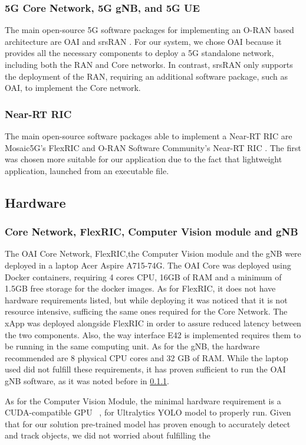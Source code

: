 \subsubsection{5G Core Network, 5G gNB, and 5G UE}
The main open-source 5G software packages for implementing an O-RAN based architecture are OAI \cite[]{} and srsRAN \cite[]{}. For our system, we chose OAI because it provides all the necessary components to deploy a 5G standalone network, including both the RAN and Core networks. In contrast, srsRAN only supports the deployment of the RAN, requiring an additional software package, such as OAI, to implement the Core network.

\subsubsection{Near-RT RIC}
The main open-source software packages able to implement a Near-RT RIC are Mosaic5G’s FlexRIC \cite[]{} and  O-RAN Software Community’s Near-RT RIC \cite[]{}.
The first was chosen more suitable for our application due to the fact that lightweight application, launched from an executable file.

\subsection{Hardware}
\subsubsection{Core Network, FlexRIC, Computer Vision module and gNB}
The OAI Core Network, FlexRIC,the Computer Vision module and the gNB were deployed in a laptop Acer Aspire A715-74G\@.
The OAI Core was deployed using Docker containers, requiring 4 cores CPU, 16GB of RAM and a minimum of 1.5GB free storage for the docker images.
As for FlexRIC, it does not have hardware requirements listed, but while deploying it was noticed that it is not resource intensive, sufficing the same ones required for the Core Network.
The xApp was deployed alongside FlexRIC in order to assure reduced latency between the two components.
Also,  the way interface E42 is implemented requires them to be running in the same computing unit.
As for the gNB, the hardware recommended are 8 physical CPU cores and 32 GB of RAM\@.
While the laptop used did not fulfill these requirements, it has proven sufficient to run the OAI gNB software, as it was noted before in \ref{}. %

As for the Computer Vision Module, the minimal hardware requirement is a CUDA-compatible GPU ~\cite{}, for Ultralytics YOLO model to properly run.
Given that for our solution pre-trained model has proven enough to accurately detect and track objects, we did not worried about fulfilling the



